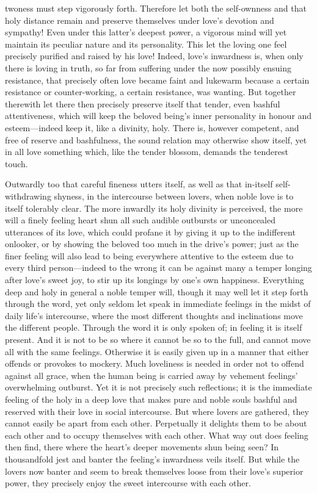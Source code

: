 \documentclass[12pt,a4paper]{book}
\begin{document}
twoness must step vigorously forth. Therefore let both the self-ownness and
that holy distance remain and preserve themselves under love's devotion and
sympathy! Even under this latter's deepest power, a vigorous mind will yet
maintain its peculiar nature and its personality. This let the loving one
feel precisely purified and raised by his love! Indeed, love's inwardness
is, when only there is loving in truth, so far from suffering under the now
possibly ensuing resistance, that precisely often love became faint and
lukewarm because a certain resistance or counter-working, a certain
resistance, was wanting. But together therewith let there then precisely
preserve itself that tender, even bashful attentiveness, which will keep
the beloved being's inner personality in honour and esteem---indeed keep
it, like a divinity, holy. There is, however competent, and free of reserve
and bashfulness, the sound relation may otherwise show itself, yet in all
love something which, like the tender blossom, demands the tenderest touch.

Outwardly too that careful fineness utters itself, as well as that
in-itself self-withdrawing shyness, in the intercourse between lovers, when
noble love is to itself tolerably clear. The more inwardly its holy
divinity is perceived, the more will a finely feeling heart shun all such
audible outbursts or unconcealed utterances of its love, which could
profane it by giving it up to the indifferent onlooker, or by showing the
beloved too much in the drive's power; just as the finer feeling will also
lead to being everywhere attentive to the esteem due to every third
person---indeed to the wrong it can be against many a temper longing after
love's sweet joy, to stir up its longings by one's own happiness.
Everything deep and holy in general a noble temper will, though it may well
let it step forth through the word, yet only seldom let speak in immediate
feelings in the midst of daily life's intercourse, where the most different
thoughts and inclinations move the different people. Through the word it is
only spoken of; in feeling it is itself present. And it is not to be so
where it cannot be so to the full, and cannot move all with the same
feelings. Otherwise it is easily given up in a manner that either offends
or provokes to mockery. Much loveliness is needed in order not to offend
against all grace, when the human being is carried away by vehement
feelings' overwhelming outburst. Yet it is not precisely such reflections;
it is the immediate feeling of the holy in a deep love that makes pure and
noble souls bashful and reserved with their love in social intercourse.
But where lovers are gathered, they cannot easily be apart from each other.
Perpetually it delights them to be about each other and to occupy
themselves with each other. What way out does feeling then find, there
where the heart's deeper movements shun being seen? In thousandfold jest
and banter the feeling's inwardness veils itself. But while the lovers now
banter and seem to break themselves loose from their love's superior power,
they precisely enjoy the sweet intercourse with each other.
\end{document}
